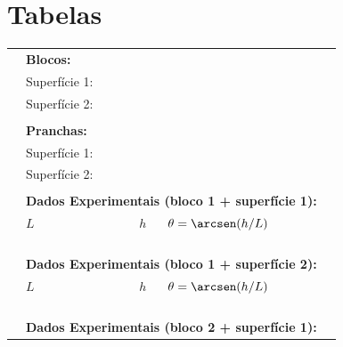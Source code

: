 \section{Tabelas}

\begin{table}[!ht]
\centering
\begin{tabular}{lp{28mm}p{28mm}p{28mm}l}
\toprule
    & \textbf{Blocos:} \\
    \cmidrule{2-3}
    & \cellcolor[gray]{0.89} Superfície 1: & \cellcolor[gray]{0.92} \\
    & \cellcolor[gray]{0.95} Superfície 2: & \cellcolor[gray]{0.97} \\
    \cmidrule{2-3}
    \\
    & \textbf{Pranchas:} \\
    \cmidrule{2-3}
    & \cellcolor[gray]{0.89} Superfície 1: & \cellcolor[gray]{0.92} \\
    & \cellcolor[gray]{0.95} Superfície 2: & \cellcolor[gray]{0.97} \\
    \cmidrule{2-3}
    \\
	&\multicolumn{3}{l}{\textbf{Dados Experimentais (bloco 1 + superfície 1):}} \\
	\cmidrule{2-4}
	& $L$ & $h$ & $\theta = \arcsen (h/L)$ & \\
	\cmidrule{2-4}
	& \cellcolor[gray]{0.89} & \cellcolor[gray]{0.92} & \cellcolor[gray]{0.89} \\
	& \cellcolor[gray]{0.95} & \cellcolor[gray]{0.97} & \cellcolor[gray]{0.95} \\
	& \cellcolor[gray]{0.89} & \cellcolor[gray]{0.92} & \cellcolor[gray]{0.89} \\	
	\cmidrule{2-4}
    \\
	&\multicolumn{3}{l}{\textbf{Dados Experimentais (bloco 1 + superfície 2):}} \\
	\cmidrule{2-4}
	& $L$ & $h$ & $\theta = \arcsen (h/L)$ & \\
	\cmidrule{2-4}
	& \cellcolor[gray]{0.89} & \cellcolor[gray]{0.92} & \cellcolor[gray]{0.89} \\
	& \cellcolor[gray]{0.95} & \cellcolor[gray]{0.97} & \cellcolor[gray]{0.95} \\
	& \cellcolor[gray]{0.89} & \cellcolor[gray]{0.92} & \cellcolor[gray]{0.89} \\	
	\cmidrule{2-4}
    \\
	&\multicolumn{3}{l}{\textbf{Dados Experimentais (bloco 2 + superfície 1):}} \\

\end{tabular}
\end{table}
